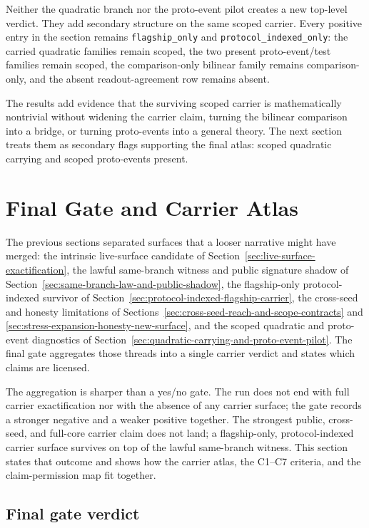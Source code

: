 \documentclass[11pt]{article}
\theoremstyle{definition}
\begin{document}
Neither the quadratic branch nor the proto-event pilot creates a new top-level
verdict. They add secondary structure on the same scoped carrier. Every positive entry
in the section remains \texttt{flagship\_only} and \texttt{protocol\_indexed\_only}:
the carried quadratic families remain scoped, the two present proto-event/test
families remain scoped, the comparison-only bilinear family remains comparison-only,
and the absent readout-agreement row remains absent.

The results add evidence that the surviving scoped carrier is mathematically
nontrivial without widening the carrier claim, turning the bilinear comparison into a
bridge, or turning proto-events into a general theory. The next section treats them as
secondary flags supporting the final atlas: scoped quadratic carrying and scoped
proto-events present.
 \section{Final Gate and Carrier Atlas}
\label{sec:final-gate-and-carrier-atlas}
\label{sec:final-gate}

The previous sections separated surfaces that a looser narrative might have merged:
the intrinsic live-surface candidate of Section~\ref{sec:live-surface-exactification},
the lawful same-branch witness and public signature shadow of
Section~\ref{sec:same-branch-law-and-public-shadow}, the flagship-only
protocol-indexed survivor of Section~\ref{sec:protocol-indexed-flagship-carrier}, the
cross-seed and honesty limitations of
Sections~\ref{sec:cross-seed-reach-and-scope-contracts} and
\ref{sec:stress-expansion-honesty-new-surface}, and the scoped quadratic and
proto-event diagnostics of
Section~\ref{sec:quadratic-carrying-and-proto-event-pilot}. The final gate aggregates
those threads into a single carrier verdict and states which claims are licensed.

The aggregation is sharper than a yes/no gate. The run does not end with full carrier
exactification nor with the absence of any carrier surface; the gate records a
stronger negative and a weaker positive together. The strongest public, cross-seed,
and full-core carrier claim does not land; a flagship-only, protocol-indexed carrier
surface survives on top of the lawful same-branch witness. This section states that
outcome and shows how the carrier atlas, the C1--C7 criteria, and the claim-permission
map fit together.

\subsection{Final gate verdict}
\end{document}
